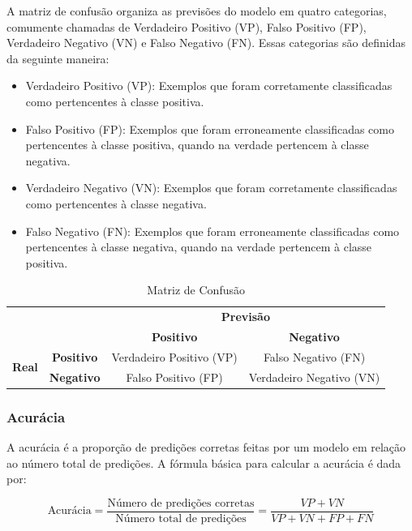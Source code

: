 A matriz de confusão organiza as previsões do modelo em quatro categorias, comumente chamadas de Verdadeiro Positivo (VP), 
Falso Positivo (FP), Verdadeiro Negativo (VN) e Falso Negativo (FN). Essas categorias são definidas da seguinte maneira:

\begin{itemize}
  \item Verdadeiro Positivo (VP): Exemplos que foram corretamente classificadas como pertencentes à classe positiva.
  \item Falso Positivo (FP): Exemplos que foram erroneamente classificadas como pertencentes à classe positiva, quando na verdade pertencem à classe negativa.
  \item Verdadeiro Negativo (VN): Exemplos que foram corretamente classificadas como pertencentes à classe negativa. 
  \item Falso Negativo (FN): Exemplos que foram erroneamente classificadas como pertencentes à classe negativa, quando na verdade pertencem à classe positiva.
\end{itemize}

\begin{table}[h]
  \centering
  \begin{tabular}{c|c|c|c|}
  & & \multicolumn{2}{c|}{\textbf{Previsão}} \\ \cline{3-4}
  & & \textbf{Positivo} & \textbf{Negativo} \\ \hline
  \multicolumn{1}{|c|}{\multirow{2}{*}{\textbf{Real}}} & \textbf{Positivo} & Verdadeiro Positivo (VP) & Falso Negativo (FN) \\ \cline{2-4}
  \multicolumn{1}{|c|}{} & \textbf{Negativo} & Falso Positivo (FP) & Verdadeiro Negativo (VN) \\ \hline
  \end{tabular}
  \caption{Matriz de Confusão}
  \label{table:confusion_matrix}
\end{table}

\subsubsection{Acurácia}
A acurácia é a proporção de predições corretas feitas por um modelo em relação ao número total de predições. 
A fórmula básica para calcular a acurácia é dada por:

\begin{equation}
  \text{Acurácia} = \frac{\text{Número de predições corretas}}{\text{Número total de predições}} = \frac{VP+VN}{VP+VN+FP+FN}
\end{equation}

